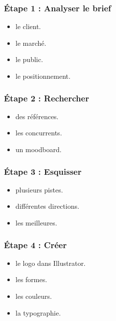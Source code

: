 \subsubsection{Étape 1 : Analyser le brief}

\begin{itemize}
    \item {} le client.
    \item {} le marché.
    \item {} le public.
    \item {} le positionnement.
\end{itemize}

\subsubsection{Étape 2 : Rechercher}

\begin{itemize}
    \item {} des références.
    \item {} les concurrents.
    \item {} un moodboard.
\end{itemize}

\subsubsection{Étape 3 : Esquisser}

\begin{itemize}
    \item {} plusieurs pistes.
    \item {} différentes directions.
    \item {} les meilleures.
\end{itemize}

\subsubsection{Étape 4 : Créer}

\begin{itemize}
    \item {} le logo dans Illustrator.
    \item {} les formes.
    \item {} les couleurs.
    \item {} la typographie.
\end{itemize}

